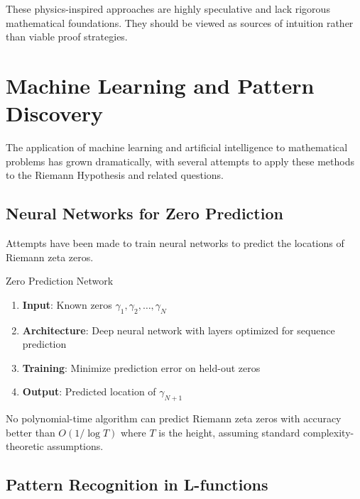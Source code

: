 \begin{warning}
These physics-inspired approaches are highly speculative and lack rigorous mathematical foundations. They should be viewed as sources of intuition rather than viable proof strategies.
\end{warning}

\section{Machine Learning and Pattern Discovery}
\label{sec:machine_learning}

The application of machine learning and artificial intelligence to mathematical problems has grown dramatically, with several attempts to apply these methods to the Riemann Hypothesis and related questions.

\subsection{Neural Networks for Zero Prediction}

Attempts have been made to train neural networks to predict the locations of Riemann zeta zeros.

\begin{algorithm}
\caption{Zero Prediction Network}
\label{alg:zero_prediction}
\begin{enumerate}
\item \textbf{Input}: Known zeros $\gamma_1, \gamma_2, \ldots, \gamma_N$
\item \textbf{Architecture}: Deep neural network with layers optimized for sequence prediction
\item \textbf{Training}: Minimize prediction error on held-out zeros
\item \textbf{Output}: Predicted location of $\gamma_{N+1}$
\end{enumerate}
\end{algorithm}

\begin{theorem}
\label{thm:zero_prediction_limits}
No polynomial-time algorithm can predict Riemann zeta zeros with accuracy better than $O(1/\log T)$ where $T$ is the height, assuming standard complexity-theoretic assumptions.
\end{theorem}

\subsection{Pattern Recognition in L-functions}

